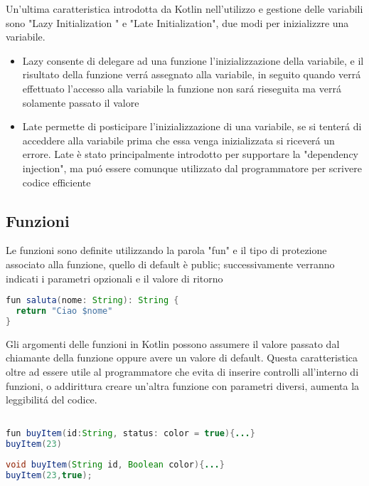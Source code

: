 Un'ultima caratteristica introdotta da Kotlin nell'utilizzo e gestione delle variabili sono  "Lazy  Initialization " e "Late Initialization", due modi per inizializzre una variabile.
\begin{itemize}                         %
\item Lazy consente di delegare ad una funzione l'inizializzazione della variabile, e il risultato della funzione verr\'a assegnato alla variabile, in seguito quando verr\'a effettuato l'accesso alla variabile la funzione non sar\'a rieseguita ma verr\'a solamente passato il valore
\item Late permette di posticipare l'inizializzazione di una variabile, se si tenter\'a di acceddere alla variabile prima che essa venga inizializzata si ricever\'a un errore. Late è stato principalmente introdotto per supportare la "dependency injection", ma pu\'o essere comunque utilizzato dal programmatore per scrivere codice efficiente
\end{itemize}





\subsection{Funzioni}
Le funzioni sono definite utilizzando la parola "fun" e il tipo di protezione associato alla funzione, quello di default è public; successivamente verranno indicati i parametri opzionali e il valore di ritorno


\begin{lstlisting}[language=java,caption={Esempio Kotlin}]
fun saluta(nome: String): String {
  return "Ciao $nome"
}
\end{lstlisting}


Gli argomenti delle funzioni in Kotlin possono assumere il valore passato dal chiamante della
funzione oppure avere un valore di default. Questa caratteristica oltre ad essere utile al programmatore
che evita di inserire controlli all'interno di funzioni, o addirittura creare un'altra funzione con parametri diversi, aumenta la leggibilit\'a del codice.

\begin{lstlisting}[language=java,caption={Esempio Kotlin}]

fun buyItem(id:String, status: color = true){...}
buyItem(23)
\end{lstlisting}

\begin{lstlisting}[language=java,caption={Esempio Java}]
void buyItem(String id, Boolean color){...}
buyItem(23,true);

\end{lstlisting}



